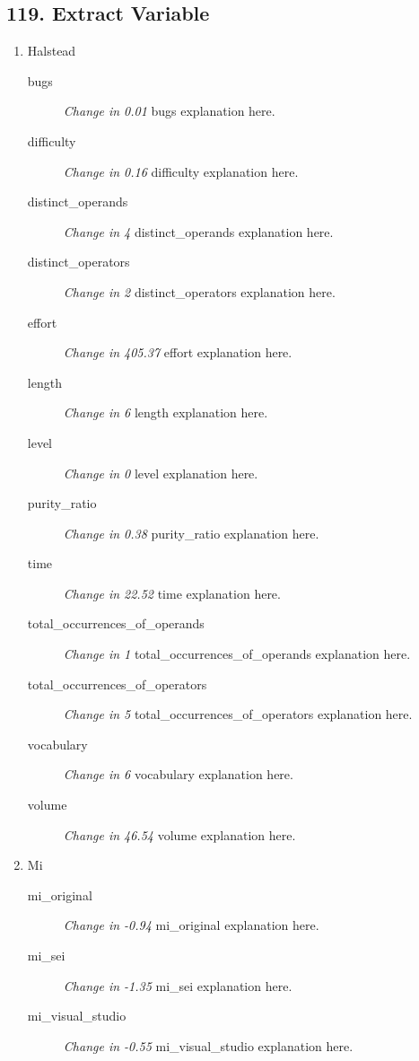 \subsection{ 119.  Extract Variable }

\begin{enumerate}
  \item Halstead
        \begin{description}
          \item [bugs] \textit{Change in 0.01} bugs explanation here.
          \item [difficulty] \textit{Change in 0.16} difficulty explanation here.
          \item [distinct\_operands] \textit{Change in 4} distinct\_operands explanation here.
          \item [distinct\_operators] \textit{Change in 2} distinct\_operators explanation here.
          \item [effort] \textit{Change in 405.37} effort explanation here.
          \item [length] \textit{Change in 6} length explanation here.
          \item [level] \textit{Change in 0} level explanation here.
          \item [purity\_ratio] \textit{Change in 0.38} purity\_ratio explanation here.
          \item [time] \textit{Change in 22.52} time explanation here.
          \item [total\_occurrences\_of\_operands] \textit{Change in 1} total\_occurrences\_of\_operands explanation here.
          \item [total\_occurrences\_of\_operators] \textit{Change in 5} total\_occurrences\_of\_operators explanation here.
          \item [vocabulary] \textit{Change in 6} vocabulary explanation here.
          \item [volume] \textit{Change in 46.54} volume explanation here.
        \end{description}
  \item Mi
        \begin{description}
          \item [mi\_original] \textit{Change in -0.94} mi\_original explanation here.
          \item [mi\_sei] \textit{Change in -1.35} mi\_sei explanation here.
          \item [mi\_visual\_studio] \textit{Change in -0.55} mi\_visual\_studio explanation here.
        \end{description}
\end{enumerate}
